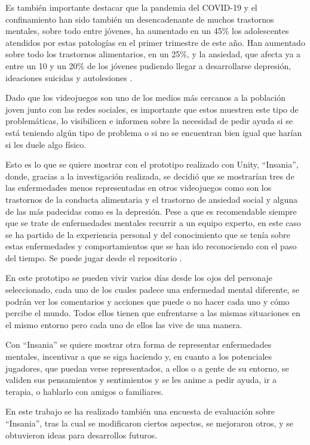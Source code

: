 \documentclass[12pt, a4paper,twoside,titlepage]{book}
\begin{document}
Es también importante destacar que la pandemia del COVID-19 y el confinamiento han sido también un desencadenante de muchos trastornos mentales, sobre todo entre jóvenes, ha aumentado en un 45\% los adolescentes atendidos por estas patologías en el primer trimestre de este año. Han aumentado sobre todo los trastornos alimentarios, en un 25\%, y la ansiedad, que afecta ya a entre un 10 y un 20\% de los jóvenes pudiendo llegar a desarrollarse depresión, ideaciones suicidas y autolesiones \cite{datosEnfJovenes}.  


Dado que los videojuegos son uno de los medios más cercanos a la población joven junto con las redes sociales, es importante que estos muestren este tipo de problemáticas, lo visibilicen e informen sobre la necesidad de pedir ayuda si se está teniendo algún tipo de problema o si no se encuentran bien igual que harían si les duele algo físico. 

Esto es lo que se quiere mostrar con el prototipo realizado con Unity, ``Insania'', donde, gracias a la investigación realizada, se decidió que se mostrarían tres de las enfermedades menos representadas en otros videojuegos como son los trastornos de la conducta alimentaria y el trastorno de ansiedad social y alguna de las más padecidas como es la depresión. Pese a que es recomendable siempre que se trate de enfermedades mentales recurrir a un equipo experto, en este caso se ha partido de la experiencia personal y del conocimiento que se tenía sobre estas enfermedades y comportamientos que se han ido reconociendo con el paso del tiempo. Se puede jugar desde el repositorio . 

En este prototipo se pueden vivir varios días desde los ojos del personaje seleccionado, cada uno de los cuales padece una enfermedad mental diferente, se podrán ver los comentarios y acciones que puede o no hacer cada uno y cómo percibe el mundo. Todos ellos tienen que enfrentarse a las mismas situaciones en el mismo entorno pero cada uno de ellos las vive de una manera. 

Con ``Insania'' se quiere mostrar otra forma de representar enfermedades mentales, incentivar a que se siga haciendo y, en cuanto a los potenciales jugadores, que puedan verse representados, a ellos o a gente de su entorno, se validen sus pensamientos y sentimientos y se les anime a pedir ayuda, ir a terapia, o hablarlo con amigos o familiares. 

En este trabajo se ha realizado también una encuesta de evaluación sobre ``Insania'', tras la cual se modificaron ciertos aspectos, se mejoraron otros, y se obtuvieron ideas para desarrollos futuros.
\end{document}
